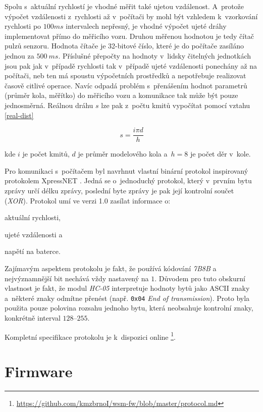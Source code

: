 Spolu s~aktuální rychlostí je vhodné měřit také ujetou vzdálenost. A~protože
výpočet vzdálenosti z~rychlosti až v~počítači by mohl být vzhledem k~vzorkování
rychlosti po $100 ms$ intervalech nepřesný, je vhodné výpočet ujeté dráhy
implementovat přímo do měřicího vozu. Druhou měřenou hodnotou je tedy čítač
pulzů senzoru. Hodnota čítače je 32-bitové číslo, které je do počítače zasíláno
jednou za $500\ ms$. Příslušné přepočty na hodnoty v~lidsky čitelných
jednotkách jsou pak jak v~případě rychlosti tak v~případě ujeté vzdálenosti
ponechány až na počítači, neb ten má spoustu výpočetních prostředků a
nepotřebuje realizovat časově citlivé operace. Navíc odpadá problém
s~přenášením hodnot parametrů (průměr kola, měřítko) do měřicího vozu a
komunikace tak může být pouze jednosměrná. Reálnou dráhu $s$ lze pak z~počtu
kmitů vypočítat pomocí vztahu \ref{real-dist}

\begin{equation}
s = \frac{i \pi d}{h}
\label{real-dist}
\end{equation}

kde $i$ je počet kmitů, $d$ je průměr modelového kola a~$h = 8$ je počet děr
v~kole.

Pro komunikaci s~počítačem byl navrhnut vlastní binární protokol inspirovaný
protokolem XpressNET \cite{xpressnet-specs}. Jedná se o~jednoduchý protokol, který
v~prvním bytu zprávy určí délku zprávy, poslední byte zprávy je pak její
kontrolní součet (\textit{XOR}). Protokol umí ve verzi 1.0 zasílat informace o:

\begin{compactenum}
\item aktuální rychlosti,
\item ujeté vzdálenosti a
\item napětí na baterce.
\end{compactenum}

Zajímavým aspektem protokolu je fakt, že používá kódování \textit{7B8B} a
nejvýznamnější bit nechává vždy nastavený na $1$. Důvodem pro tuto obskurní
vlastnost je fakt, že modul \textit{HC-05} interpretuje hodnoty bytů jako
ASCII znaky a~některé znaky odmítne přenést (např. \texttt{0x04} \textit{End
of transmission}). Proto byla použita pouze polovina rozsahu jednoho
bytu, která neobsahuje kontrolní znaky, konkrétně interval $128$--$255$.

Kompletní specifikace protokolu je k~dispozici online
\footnote{\url{https://github.com/kmzbrnoI/wsm-fw/blob/master/protocol.md}}.

\section{Firmware}
\label{sec:wsm-fw}

